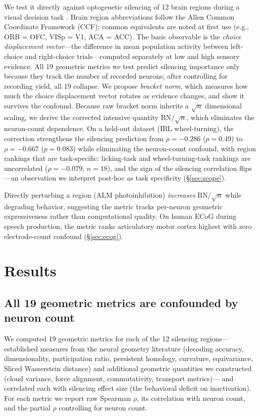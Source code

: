 \documentclass[9pt,lineno]{elife}
\begin{document}
We test it directly against optogenetic silencing of 12 brain regions during a visual decision task \citep{steinmetz2019distributed, zatkahaas2021}. Brain region abbreviations follow the Allen Common Coordinate Framework (CCF); common equivalents are noted at first use (e.g., ORB = OFC, VISp = V1, ACA = ACC). The basic observable is the \emph{choice displacement vector}---the difference in mean population activity between left-choice and right-choice trials---computed separately at low and high sensory evidence. All 19 geometric metrics we test predict silencing importance only because they track the number of recorded neurons; after controlling for recording yield, all 19 collapse. We propose \emph{bracket norm}, which measures how much the choice displacement vector rotates as evidence changes, and show it survives the confound. Because raw bracket norm inherits a $\sqrt{n}$ dimensional scaling, we derive the corrected intensive quantity $\text{BN}/\!\sqrt{n}$, which eliminates the neuron-count dependence. On a held-out dataset (IBL wheel-turning), the correction strengthens the silencing prediction from $\rho = -0.286$ ($p = 0.49$) to $\rho = -0.667$ ($p = 0.083$) while eliminating the neuron-count confound, with region rankings that are task-specific: licking-task and wheel-turning-task rankings are uncorrelated ($\rho = -0.079$, $n = 18$), and the sign of the silencing correlation flips---an observation we interpret post-hoc as task specificity (\S\ref{sec:scope}).

Directly perturbing a region (ALM photoinhibition) \emph{increases} $\text{BN}/\!\sqrt{n}$ while degrading behavior, suggesting the metric tracks per-neuron geometric expressiveness rather than computational quality. On human ECoG during speech production, the metric ranks articulatory motor cortex highest with zero electrode-count confound (\S\ref{sec:ecog}).


\section{Results}

\subsection{All 19 geometric metrics are confounded by neuron count}
\label{sec:confound}

We computed 19 geometric metrics for each of the 12 silencing regions---established measures from the neural geometry literature (decoding accuracy, dimensionality, participation ratio, persistent homology, curvature, equivariance, Sliced Wasserstein distance) and additional geometric quantities we constructed (cloud variance, force alignment, commutativity, transport metrics)--- and correlated each with silencing effect size (the behavioral deficit on inactivation). For each metric we report raw Spearman $\rho$, its correlation with neuron count, and the partial $\rho$ controlling for neuron count.
\end{document}
